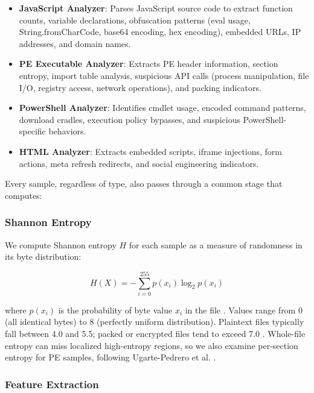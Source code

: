 \documentclass[pdflatex,sn-mathphys-num]{sn-jnl}
\theoremstyle{thmstyleone}%
\theoremstyle{thmstyletwo}%
\theoremstyle{thmstylethree}%
\begin{document}
\begin{itemize}
    \item \textbf{JavaScript Analyzer}: Parses JavaScript source code to extract function counts, variable declarations, obfuscation patterns (eval usage, String.fromCharCode, base64 encoding, hex encoding), embedded URLs, IP addresses, and domain names.
    \item \textbf{PE Executable Analyzer}: Extracts PE header information, section entropy, import table analysis, suspicious API calls (process manipulation, file I/O, registry access, network operations), and packing indicators.
    \item \textbf{PowerShell Analyzer}: Identifies cmdlet usage, encoded command patterns, download cradles, execution policy bypasses, and suspicious PowerShell-specific behaviors.
    \item \textbf{HTML Analyzer}: Extracts embedded scripts, iframe injections, form actions, meta refresh redirects, and social engineering indicators.
\end{itemize}

Every sample, regardless of type, also passes through a common stage that computes:

\subsubsection{Shannon Entropy}\label{subsubsec:entropy}

We compute Shannon entropy $H$ for each sample as a measure of randomness in its byte distribution:

\begin{equation}
H(X) = -\sum_{i=0}^{255} p(x_i) \log_2 p(x_i)
\label{eq:entropy}
\end{equation}

\noindent where $p(x_i)$ is the probability of byte value $x_i$ in the file \cite{shannon1949}. Values range from 0 (all identical bytes) to 8 (perfectly uniform distribution). Plaintext files typically fall between 4.0 and 5.5; packed or encrypted files tend to exceed 7.0 \cite{lyda2007}. Whole-file entropy can miss localized high-entropy regions, so we also examine per-section entropy for PE samples, following Ugarte-Pedrero et al. \cite{ugarte2015}.

\subsubsection{Feature Extraction}\label{subsubsec:features}
\end{document}
